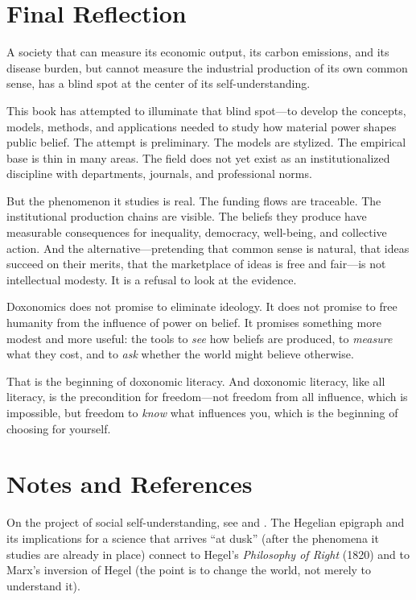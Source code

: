 \section{Final Reflection}
\label{sec:ch35-final}

A society that can measure its economic output, its carbon emissions, and its disease burden, but cannot measure the industrial production of its own common sense, has a blind spot at the center of its self-understanding.

This book has attempted to illuminate that blind spot---to develop the concepts, models, methods, and applications needed to study how material power shapes public belief.
The attempt is preliminary.
The models are stylized.
The empirical base is thin in many areas.
The field does not yet exist as an institutionalized discipline with departments, journals, and professional norms.

But the phenomenon it studies is real.
The funding flows are traceable.
The institutional production chains are visible.
The beliefs they produce have measurable consequences for inequality, democracy, well-being, and collective action.
And the alternative---pretending that common sense is natural, that ideas succeed on their merits, that the marketplace of ideas is free and fair---is not intellectual modesty.
It is a refusal to look at the evidence.

Doxonomics does not promise to eliminate ideology.
It does not promise to free humanity from the influence of power on belief.
It promises something more modest and more useful: the tools to \emph{see} how beliefs are produced, to \emph{measure} what they cost, and to \emph{ask} whether the world might believe otherwise.

That is the beginning of doxonomic literacy.
And doxonomic literacy, like all literacy, is the precondition for freedom---not freedom from all influence, which is impossible, but freedom to \emph{know} what influences you, which is the beginning of choosing for yourself.

\section{Notes and References}
\label{sec:ch35-notes}

On the project of social self-understanding, see \textcite{dewey1927} and \textcite{habermas1962}.
The Hegelian epigraph and its implications for a science that arrives ``at dusk'' (after the phenomena it studies are already in place) connect to Hegel's \emph{Philosophy of Right} (1820) and to Marx's inversion of Hegel (the point is to change the world, not merely to understand it).

